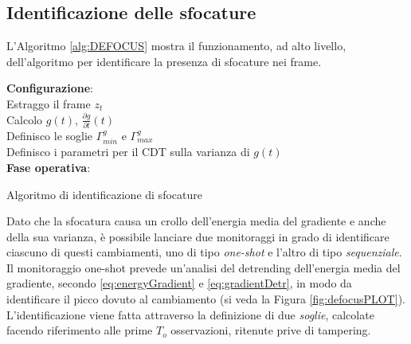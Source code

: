 \subsection{Identificazione delle sfocature}
\label{defocusDetection}
L'Algoritmo \ref{alg:DEFOCUS} mostra il funzionamento, ad alto livello, dell'algoritmo per identificare la presenza di sfocature nei frame.
\begin{algorithm}[t]
	\LinesNumbered
	\textbf{Configurazione}:\\
	 
	{	 Estraggo il frame $z_t$ \\
		 Calcolo $g(t)$, $\frac{\partial g}{\partial t}(t)$ \\
	}
	 Definisco le soglie $\Gamma_{min}^g$ e $\Gamma_{max}^g$\\
	 Definisco i parametri per il CDT sulla varianza di $g(t)$\\
	\textbf{Fase operativa}:\\
	    
	\caption{Algoritmo di identificazione di sfocature}
	\label{alg:DEFOCUS}
\end{algorithm}
Dato che la sfocatura causa un crollo dell'energia media del gradiente e anche della sua varianza, \`e possibile lanciare due monitoraggi in grado di identificare ciascuno di questi cambiamenti, uno di tipo \textit{one-shot} e l'altro di tipo \textit{sequenziale}.\\
Il monitoraggio one-shot prevede un'analisi del detrending dell'energia media del gradiente, secondo \eqref{eq:energyGradient} e \eqref{eq:gradientDetr}, in modo da identificare il picco dovuto al cambiamento (si veda la Figura \ref{fig:defocusPLOT}).
L'identificazione viene fatta attraverso la definizione di due \textit{soglie}, calcolate facendo riferimento alle prime $T_{o}$ osservazioni, ritenute prive di tampering.
